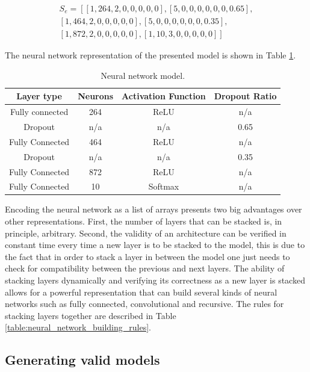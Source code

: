 \documentclass[journal]{IEEEtran}
\begin{document}
\begin{align*}
S_e = \left[ \left[1, 264, 2, 0, 0, 0, 0, 0 \right], \left[5, 0, 0, 0, 0, 0, 0, 0.65 \right], \right. \\
\left. \left[1, 464, 2, 0, 0, 0, 0, 0 \right], \left[5, 0, 0, 0, 0, 0, 0, 0.35 \right], \right. \\
\left. \left[1, 872, 2, 0, 0, 0, 0, 0 \right], \left[1, 10, 3, 0, 0, 0, 0, 0 \right] \right]
\end{align*}


The neural network representation of the presented model is shown in Table \ref{table:neural_network_model}. \\

\begin{table}[!htb]
\begin{center}
\begin{tabular}{| c | c | c | c |}
\hline
Layer type & Neurons & Activation Function & Dropout Ratio \\
\hline
Fully connected & 264 & ReLU & n/a \\
Dropout & n/a & n/a & 0.65 \\
Fully Connected & 464 & ReLU & n/a\\
Dropout & n/a & n/a & 0.35\\
Fully Connected & 872 & ReLU & n/a\\
Fully Connected & 10 & Softmax & n/a\\
\hline
\end{tabular}
\end{center}
\caption{Neural network model.}
\label{table:neural_network_model}
\end{table}

Encoding the neural network as a list of arrays presents two big advantages over other representations. First, the number of layers that can be stacked is, in principle, arbitrary. Second, the validity of an architecture can be verified in constant time every time a new layer is to be stacked to the model, this is due to the fact that in order to stack a layer in between the model one just needs to check for compatibility between the previous and next layers. The ability of stacking layers dynamically and verifying its correctness as a new layer is stacked allows for a powerful representation that can build several kinds of neural networks such as fully connected, convolutional and recursive. The rules for stacking layers together are described in Table \ref{table:neural_network_building_rules}.

\subsection{Generating valid models}
\label{sec:valid_models}
\end{document}
